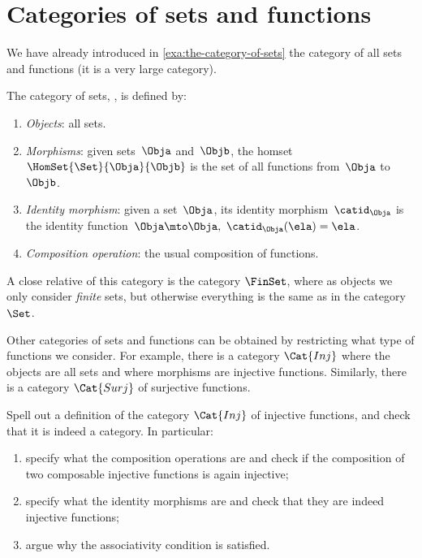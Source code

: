 
\section{Categories of sets and functions}

We have already introduced in \cref{exa:the-category-of-sets} the category of all sets and functions (it is a very large category).

\begin{ctdefinition}
    \label{def:Set}
    The category of sets, \iindex{\Set}, is defined by:
    \begin{enumerate}
        \item \emph{Objects}: all sets.
        \item \emph{Morphisms}: given sets~$\Obja$ and~$\Objb$, the homset~$\HomSet{\Set}{\Obja}{\Objb}$ is the set of all functions from~$\Obja$ to~$\Objb$.
        \item \emph{Identity morphism}: given a set~$\Obja$, its identity morphism~$\catid_\Obja$ is the identity function~$\Obja \mto \Obja, \ \catid_\Obja(\ela) = \ela$.
        \item \emph{Composition operation}: the usual composition of functions.
    \end{enumerate}
\end{ctdefinition}

A close relative of this category is the category $\FinSet$, where as objects we only consider \emph{finite} sets, but otherwise everything is the same as in the category $\Set$.

Other categories of sets and functions can be obtained by restricting what type of functions we consider.
For example, there is a category $\Cat{Inj}$ where the objects are all sets and where morphisms are injective functions.
Similarly, there is a category $\Cat{Surj}$ of surjective functions.

\begin{exercise}
    Spell out a definition of the category $\Cat{Inj}$ of injective functions, and check that it is indeed a category.
    In particular:
    \begin{enumerate}
        \item specify what the composition operations are and check if the composition of two composable injective functions is again injective;
        \item specify what the identity morphisms are and check that they are indeed injective functions;
        \item argue why the associativity condition is satisfied.
    \end{enumerate}
\end{exercise}

